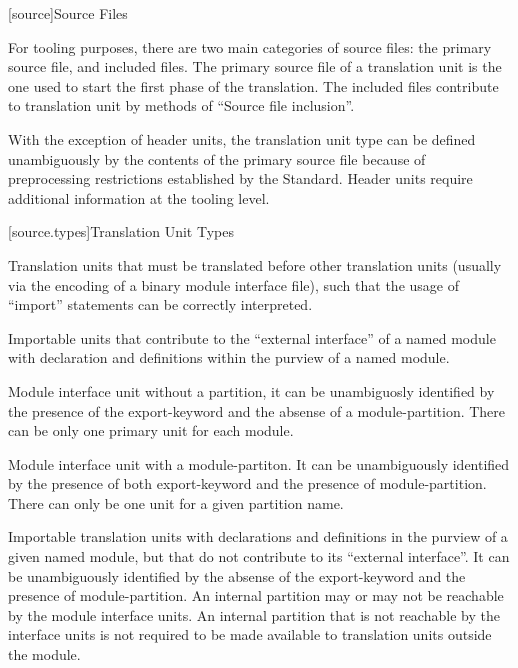 
[source]{Source Files}

%

\pnum For tooling purposes, there are two main categories of source
files: the primary source file, and included files. The primary source
file of a translation unit is the one used to start the first phase of
the translation.  The included files contribute to translation unit by
methods of ``Source file inclusion''.

\pnum With the exception of header units, the translation unit type
can be defined unambiguously by the contents of the primary source
file because of preprocessing restrictions established by the \Cpp{}
Standard. Header units require additional information at the tooling
level.

[source.types]{Translation Unit Types}

%
%
%
Translation units that must be translated before other translation
units (usually via the encoding of a binary module interface file),
such that the usage of ``import'' statements can be correctly
interpreted.

%
%
%
Importable units that contribute to the ``external interface'' of a
named module with declaration and definitions within the purview of a
named module.

%
%
%
Module interface unit without a partition, it can be unambiguosly
identified by the presence of the export-keyword and the absense of a
module-partition. There can be only one primary unit for each module.

%
%
%
Module interface unit with a module-partiton. It can be unambiguously
identified by the presence of both export-keyword and the presence of
module-partition. There can only be one unit for a given partition
name.

%
%
%
Importable translation units with declarations and definitions in the
purview of a given named module, but that do not contribute to its
``external interface''. It can be unambiguously identified by the
absense of the export-keyword and the presence of module-partition. An
internal partition may or may not be reachable by the module interface
units. An internal partition that is not reachable by the interface
units is not required to be made available to translation units
outside the module.

